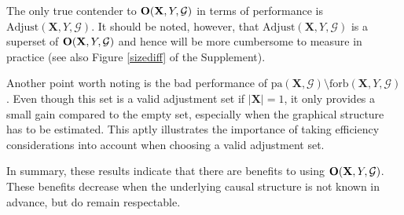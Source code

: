 \documentclass[11pt,a4paper]{article}
\theoremstyle{definition}
\theoremstyle{remark}
\newcommand{\g}[1][G]{\mathcal{#1}}
\begin{document}
The only true contender to $\text{\textbf{O}}(\mathbf{X},Y,\g)$ in terms of performance is $\text{Adjust}(\mathbf{X},Y,\g)$. It should be noted, however, that $\text{Adjust}(\mathbf{X},Y,\g)$ is a superset of $\text{\textbf{O}}(\mathbf{X},Y,\g)$ and hence will be more cumbersome to measure in practice (see also Figure \ref{sizediff} of the Supplement). 


Another point worth noting is the bad performance of $\textrm{pa}(\mathbf{X},\g) \setminus \textrm{forb}(\mathbf{X},Y,\g)$. Even though this set is a valid adjustment set if $|\mathbf{X}|=1$, it only provides a small gain compared to the empty set, especially when the graphical structure has to be estimated. This aptly illustrates the importance of taking efficiency considerations into account when choosing a valid adjustment set.


%	
In summary, these results indicate that there are benefits to using $\text{\textbf{O}}(\mathbf{X},Y,\g)$. These benefits decrease when the underlying causal structure is not known in advance, but do remain respectable. 
\end{document}
